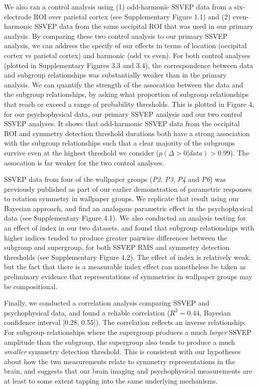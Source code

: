 \documentclass[11pt, twoside]{article}
\begin{document}
We also ran a control analysis using (1) odd-harmonic SSVEP data from a six-electrode ROI over parietal cortex (see Supplementary Figure 1.1) and (2) even-harmonic SSVEP data from the same occipital ROI that was used in our primary analysis. By comparing these two control analysis to our primary SSVEP analysis, we can address the specify of our effects in terms of location (occipital cortex vs parietal cortex) and harmonic (odd vs even). For both control analyses (plotted in Supplementary Figures 3.3 and 3.4), the correspondence between data and subgroup relationships was substantially weaker than in the primary analysis. We can quantify the strength of the assocation between the data and the subgroup relationships, by asking what proportion of subgroup relationships that reach or exceed a range of probability thresholds. This is plotted in Figure 4, for our psychophysical data, our primary SSVEP analysis and our two control SSVEP analyses. It shows that odd-harmonic SSVEP data from the occipital ROI and symmetry detection threshold durations both have a strong association with the subgroup relationships such that a clear majority of the subgroups survive even at the highest threshold we consider ($p(\Delta>0|data)>0.99$). The assocation is far weaker for the two control analyses.

SSVEP data from four of the wallpaper groups (\textit{P2}, \textit{P3}, \textit{P4} and \textit{P6}) was previously published as part of our earlier demonstration of parametric responses to rotation symmetry in wallpaper groups\cite{RN1725}. We replicate that result using our Bayesian approach, and find an analogous parametric effect in the psychophysical data (see Supplementary Figure 4.1). We also conducted an analysis testing for an effect of index in our two datasets, and found that subgroup relationships with higher indices tended to produce greater pairwise differences between the subgroup and supergroup, for both SSVEP RMS and symmetry detection thresholds (see Supplementary Figure 4.2). The effect of index is relatively weak, but the fact that there is a measurable index effect can nonetheless be taken as preliminary evidence that representations of symmetries in wallpaper groups may be compositional.

Finally, we conducted a correlation analysis comparing SSVEP and psychophysical data, and found a reliable correlation ($R^2 = 0.44$, Bayesian confidence interval [0.28, 0.55]). The correlation reflects an inverse relationship: For subgroup relationships where the supergroup produces a much \textit{larger} SSVEP amplitude than the subgroup, the supergroup also tends to produce a much \textit{smaller} symmetry detection threshold. This is consistent with our hypotheses about how the two measurements relate to symmetry representations in the brain, and suggests that our brain imaging and psychophysical measurements are at least to some extent tapping into the same underlying mechanisms.
\end{document}

